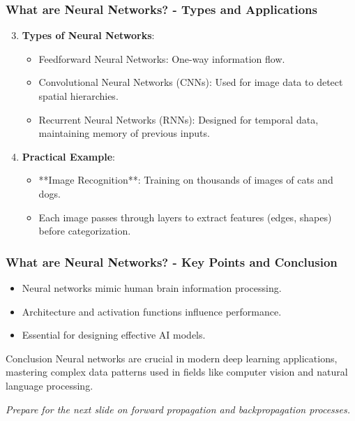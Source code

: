 \documentclass[aspectratio=169]{beamer}
\begin{document}
\begin{frame}[fragile]
    \frametitle{What are Neural Networks? - Types and Applications}
    \begin{enumerate}
        \setcounter{enumi}{2}  %
        \item \textbf{Types of Neural Networks}:
            \begin{itemize}
                \item Feedforward Neural Networks: One-way information flow.
                \item Convolutional Neural Networks (CNNs): Used for image data to detect spatial hierarchies.
                \item Recurrent Neural Networks (RNNs): Designed for temporal data, maintaining memory of previous inputs.
            \end{itemize}
        \item \textbf{Practical Example}:
            \begin{itemize}
                \item **Image Recognition**: Training on thousands of images of cats and dogs.
                \item Each image passes through layers to extract features (edges, shapes) before categorization.
            \end{itemize}
    \end{enumerate}
\end{frame}

\begin{frame}[fragile]
    \frametitle{What are Neural Networks? - Key Points and Conclusion}
    \begin{itemize}
        \item Neural networks mimic human brain information processing.
        \item Architecture and activation functions influence performance.
        \item Essential for designing effective AI models.
    \end{itemize}
    \begin{block}{Conclusion}
        Neural networks are crucial in modern deep learning applications, mastering complex data patterns used in fields like computer vision and natural language processing.
    \end{block}
    \textit{Prepare for the next slide on forward propagation and backpropagation processes.}
\end{frame}
\end{document}
